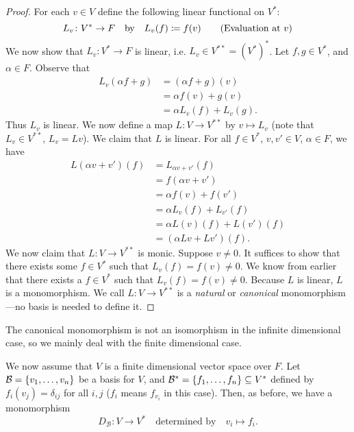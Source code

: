\documentclass[class=article, crop=false]{standalone}
\begin{document}
  \begin{proof}
    For each $v\in V$ define the following linear functional on $V^*$:
    \[
      L_v\colon V^*\to F \quad \text{by}\quad L_v(f)\coloneqq f(v) \tag{Evaluation at $v$}
    \]
    We now show that $L_v\colon V^*\to F$ is linear, i.e. $L_v\in V^{* *} = (V^*)^*$. Let $f, g\in V^*$, and $\alpha\in F$. Observe that
    \begin{align*}
      L_v(\alpha f + g) &= (\alpha f + g)(v) \\
                        &= \alpha f(v) + g(v) \\
                        &= \alpha L_v(f) + L_v(g).
    \end{align*}
    Thus $L_v$ is linear. We now define a map $L\colon V\to V^{* *}$ by $v\mapsto L_v$ (note that $L_v\in V^{* *}$, $L_v = Lv$). We claim that $L$ is linear. For all $f\in V^*$, $v,v'\in V$, $\alpha\in F$, we have
    \begin{align*}
      L(\alpha v + v')(f) &= L_{\alpha v + v'}(f) \\
                          &= f(\alpha v + v') \\
                          &= \alpha f(v) + f(v') \\
                          &= \alpha L_v(f) + L_{v'}(f) \\
                          &= \alpha L(v)(f) + L(v')(f) \\
                          &= (\alpha Lv + Lv')(f).
    \end{align*}
    We now claim that $L\colon V\to V^{* *}$ is monic. Suppose $v\neq 0$. It suffices to show that there exists some $f\in V^*$ such that $L_v(f) = f(v) \neq 0$. We know from earlier that there exists a $f\in V^*$ such that $L_v(f) = f(v) \neq 0$. Because $L$ is linear, $L$ is a monomorphism. We call $L\colon V\to V^{* *}$ is a \emph{natural} or \emph{canonical} monomorphism---no basis is needed to define it.
  \end{proof}
  \begin{note}{}
    The canonical monomorphism is not an isomorphism in the infinite dimensional case, so we mainly deal with the finite dimensional case.
  \end{note}
  We now assume that $V$ is a finite dimensional vector space over $F$. Let $\mathcal{B} = \left\{v_1,\dotsc,v_n\right\}$ be a basis for $V$, and $\mathcal{B}^* = \left\{f_1,\dotsc,f_n\right\}\subseteq V^*$ defined by $f_i(v_j) = \delta_{ij}$ for all $i, j$ ($f_i$ means $f_{v_i}$ in this case). Then, as before, we have a monomorphism
  \[
    D_{\mathcal{B}}\colon V\to V^* \quad \text{determined by}\quad v_i\mapsto f_i.
  \]
\end{document}

